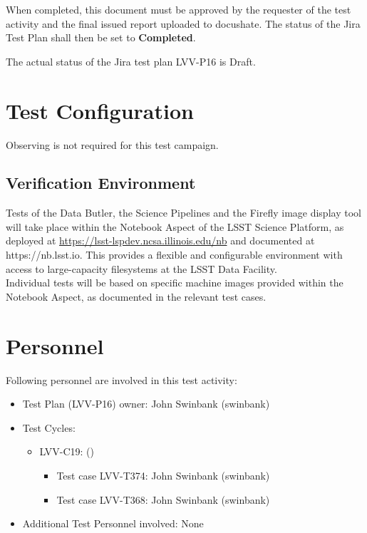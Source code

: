 \documentclass[DM,lsstdraft,STR,toc]{lsstdoc}
\begin{document}
When completed, this document must be approved by the requester of the test activity and
the final issued report uploaded to docushate. The status of the Jira Test Plan shall then be set to {\bf Completed}.

The actual status of the Jira test plan LVV-P16 is Draft.

\section{Test Configuration}
\label{sect:configuration}

Observing is not required for this test campaign.

\subsection{Verification Environment}
\label{sect:hwconf}
Tests of the Data Butler, the Science Pipelines and the Firefly image
display tool will take place within the Notebook Aspect of the LSST
Science Platform, as deployed at
\url{https://lsst-lspdev.ncsa.illinois.edu/nb} and documented at
https://nb.lsst.io. This provides a flexible and configurable
environment with access to large-capacity filesystems at the LSST Data
Facility.\\[2\baselineskip]Individual tests will be based on specific
machine images provided within the Notebook Aspect, as documented in the
relevant test cases.~





\section{Personnel}
\label{sect:personnel}

Following personnel are involved in this test activity:

\begin{itemize}
\item Test Plan (LVV-P16) owner: John Swinbank (swinbank)
\item Test Cycles:
\begin{itemize}
  \item LVV-C19:  ()
  \begin{itemize}
    \item Test case LVV-T374: John Swinbank (swinbank)
    \item Test case LVV-T368: John Swinbank (swinbank)
  \end{itemize}
\end{itemize}
\item Additional Test Personnel involved: None
\end{itemize}
\end{document}
